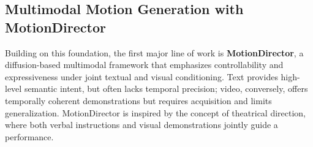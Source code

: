 \documentclass[a4paper,12pt]{article}
\begin{document}





\subsection{Multimodal Motion Generation with MotionDirector}
Building on this foundation, the first major line of work is \textbf{MotionDirector}, a diffusion-based multimodal framework that emphasizes controllability and expressiveness under joint textual and visual conditioning. Text provides high-level semantic intent, but often lacks temporal precision; video, conversely, offers temporally coherent demonstrations but requires acquisition and limits generalization. MotionDirector is inspired by the concept of theatrical direction, where both verbal instructions and visual demonstrations jointly guide a performance. 
\end{document}
